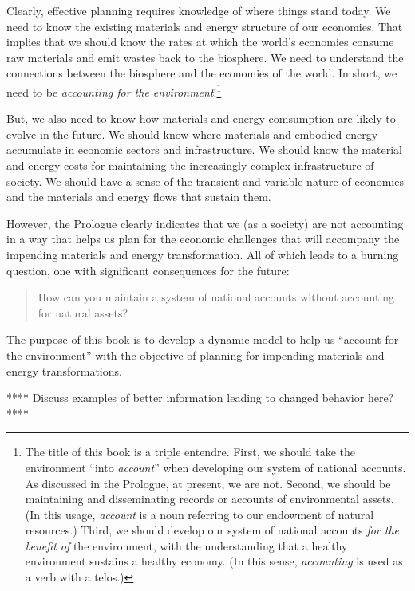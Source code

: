 Clearly, effective planning requires knowledge of where things stand today.
We need to know the existing materials and energy structure of our economies. 
That implies that we should know the rates at which 
the world's economies consume raw materials and emit wastes back to the biosphere.
We need to understand the connections between the biosphere and the economies of the world.
In short, we need to be \emph{accounting for the environment}!\footnote{The title 
	of this book is a triple entendre.
	First, we should take the environment ``into \emph{account}''
		when developing our system of national accounts.
		As discussed in the Prologue, at present, we are not.
	Second, we should be maintaining and disseminating
		records or accounts of environmental assets. 
		(In this usage, \emph{account} is a noun
		referring to our endowment of natural resources.)
	Third, we should develop our system of national accounts 
		\emph{for the benefit of} the environment, 
		with the understanding 
		that a healthy environment sustains a healthy economy.
		(In this sense, \emph{accounting} is used as a verb with a telos.)}

But, we also need to know how materials and energy comsumption 
are likely to evolve in the future.
We should know where materials and embodied energy accumulate 
in economic sectors and infrastructure. 
We should know the material and energy costs for maintaining the
increasingly-complex infrastructure of society.
We should have a sense of the transient and variable nature of economies
and the materials and energy flows that sustain them.

However, the Prologue clearly indicates that we (as a society) 
are not accounting in a way that helps us plan 
for the economic challenges that will accompany 
the impending materials and energy transformation.
All of which leads to a burning question,
one with significant consequences for the future:

\begin{quote}
	How can you maintain a system of national accounts without accounting for natural assets?
\end{quote}

The purpose of this book is to develop a dynamic model to help us
``account for the environment''
with the objective of planning for impending materials and energy transformations.

**** Discuss examples of better information leading to changed behavior here? ****


